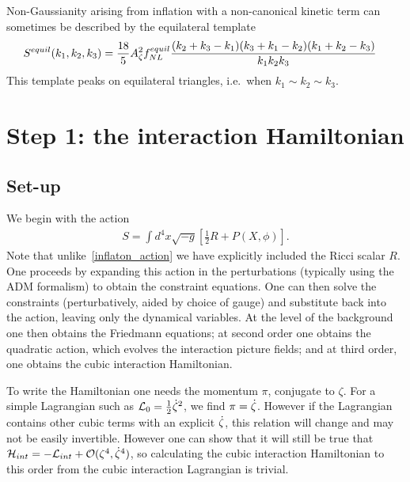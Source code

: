     Non-Gaussianity arising from inflation with a non-canonical kinetic term can
    sometimes be described by the equilateral template
\begin{align}\label{equil_shape}
    S^{equil}(k_1,k_2,k_3)
    &= \frac{18}{5}A_\zeta^2f^{equil}_{NL}\frac{(k_2+k_3-k_1)(k_3+k_1-k_2)(k_1+k_2-k_3)}{k_1k_2k_3}
\end{align}
This template peaks on equilateral triangles, i.e.\ when $k_1\sim k_2\sim k_3$.


    \section{Step 1: the interaction Hamiltonian}
    \subsection{Set-up}
    We begin with the action
    \begin{align}\label{gr_action}
        S=\int d^4x\sqrt{-g}\left[\frac{1}{2}R+P(X, \phi)\right].
    \end{align}
    Note that unlike~\eqref{inflaton_action} we have explicitly included the
    Ricci scalar $R$.
    One proceeds by expanding this action in the perturbations (typically
    using the ADM formalism)
    to obtain the constraint equations. One can then solve the constraints
    (perturbatively, aided by choice of gauge) and substitute
    back into the action, leaving only the dynamical variables.
    At the level of the background one then obtains the Friedmann equations;
    at second order one obtains the quadratic action, which evolves the
    interaction picture fields; and at third order, one obtains the cubic
    interaction Hamiltonian.


    To write the Hamiltonian one needs the momentum $\pi$, conjugate to $\zeta$.
    For a simple Lagrangian such as $\mathcal{L}_{0}=\frac{1}{2}\dot{\zeta}^2$,
    we find $\pi=\dot{\zeta}$. However if the Lagrangian contains other cubic terms
    with an explicit $\dot{\zeta}$, this relation will change and may not be easily invertible.
    However one can show that it will still be true that $\mathcal{H}_{int}=-\mathcal{L}_{int}+\mathcal{O}(\zeta^4,\dot{\zeta}^4)$,
    so calculating the cubic interaction Hamiltonian to this order
    from the cubic interaction Lagrangian is trivial.


